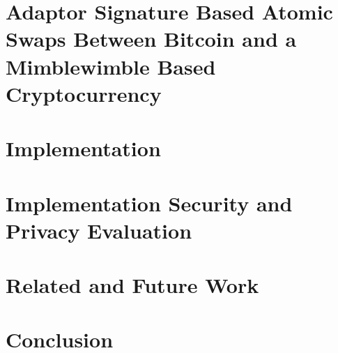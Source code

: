 \documentclass[draft,final]{vutinfth} %
\theoremstyle{definition}
\begin{document}
\chapter{Adaptor Signature Based Atomic Swaps Between Bitcoin and a Mimblewimble Based Cryptocurrency}\label{chp:atomicSwap}


\chapter{Implementation}\label{chp:implementation}


\chapter{Implementation Security and Privacy Evaluation}\label{chp:evaluation}


\chapter{Related and Future Work}\label{chp:futurework}


\chapter{Conclusion}\label{chp:conclusion}



\backmatter

\listoffigures %

\cleardoublepage %
\listoftables %

\listofalgorithms
{}

\printindex

\printglossaries



\end{document}
